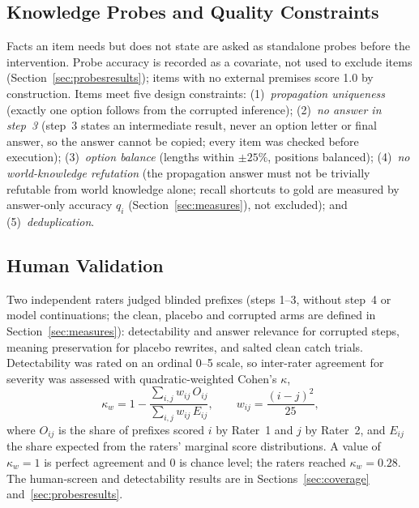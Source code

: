 \subsection{Knowledge Probes and Quality Constraints}
\label{sec:probes}

Facts an item needs but does not state are asked as standalone probes before the intervention. Probe accuracy is recorded as a covariate, not used to exclude items (Section~\ref{sec:probesresults}); items with no external premises score 1.0 by construction.
Items meet five design constraints: (1)~\emph{propagation uniqueness} (exactly one option follows from the corrupted inference); (2)~\emph{no answer in step~3} (step~3 states an intermediate result, never an option letter or final answer, so the answer cannot be copied; every item was checked before execution); (3)~\emph{option balance} (lengths within $\pm25\%$, positions balanced); (4)~\emph{no world-knowledge refutation} (the propagation answer must not be trivially refutable from world knowledge alone; recall shortcuts to gold are measured by answer-only accuracy $q_i$ (Section~\ref{sec:measures}), not excluded); and (5)~\emph{deduplication}.

\subsection{Human Validation}
\label{sec:validation}

Two independent raters judged blinded prefixes (steps 1--3, without step~4 or model continuations; the clean, placebo and corrupted arms are defined in Section~\ref{sec:measures}): detectability and answer relevance for corrupted steps, meaning preservation for placebo rewrites, and salted clean catch trials. Detectability was rated on an ordinal 0--5 scale, so inter-rater agreement for severity was assessed with quadratic-weighted Cohen's $\kappa$,
\begin{equation}\label{eq:kappa}
\kappa_w = 1 - \frac{\sum_{i,j} w_{ij}\,O_{ij}}{\sum_{i,j} w_{ij}\,E_{ij}}, \qquad w_{ij} = \frac{(i-j)^2}{25},
\end{equation}
where $O_{ij}$ is the share of prefixes scored $i$ by Rater~1 and $j$ by Rater~2, and $E_{ij}$ the share expected from the raters' marginal score distributions. A value of $\kappa_w = 1$ is perfect agreement and $0$ is chance level; the raters reached $\kappa_w = 0.28$. The human-screen and detectability results are in Sections~\ref{sec:coverage} and~\ref{sec:probesresults}.

